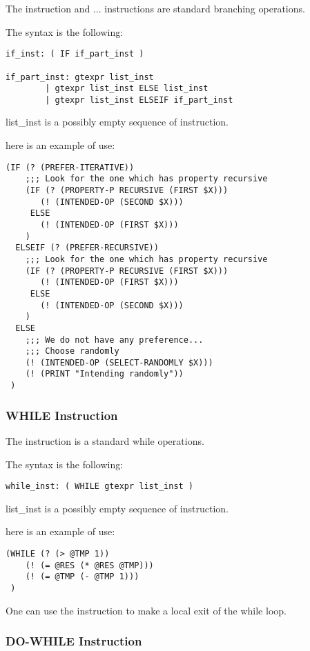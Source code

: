 The  instruction and ...  instructions
are standard branching operations.

The syntax is the following:
\begin{verbatim}
if_inst: ( IF if_part_inst )

if_part_inst: gtexpr list_inst
        | gtexpr list_inst ELSE list_inst
        | gtexpr list_inst ELSEIF if_part_inst
\end{verbatim}

list\_inst is a possibly empty sequence of instruction.

here is an example of use:
\begin{verbatim}
(IF (? (PREFER-ITERATIVE))
    ;;; Look for the one which has property recursive
    (IF (? (PROPERTY-P RECURSIVE (FIRST $X)))
       (! (INTENDED-OP (SECOND $X)))
     ELSE
       (! (INTENDED-OP (FIRST $X)))
    )
  ELSEIF (? (PREFER-RECURSIVE))
    ;;; Look for the one which has property recursive
    (IF (? (PROPERTY-P RECURSIVE (FIRST $X)))
       (! (INTENDED-OP (FIRST $X)))
     ELSE
       (! (INTENDED-OP (SECOND $X)))
    )
  ELSE
    ;;; We do not have any preference... 
    ;;; Choose randomly
    (! (INTENDED-OP (SELECT-RANDOMLY $X)))
    (! (PRINT "Intending randomly"))
 )
\end{verbatim}

\subsubsection{WHILE Instruction}


The  instruction is a standard while operations.

The syntax is the following:
\begin{verbatim}
while_inst: ( WHILE gtexpr list_inst )
\end{verbatim}

list\_inst is a possibly empty sequence of instruction.

here is an example of use:
\begin{verbatim}
(WHILE (? (> @TMP 1))
    (! (= @RES (* @RES @TMP)))
    (! (= @TMP (- @TMP 1)))
 )
\end{verbatim}

One can use the  instruction to make a local exit of the while
loop.

\subsubsection{DO-WHILE Instruction}


